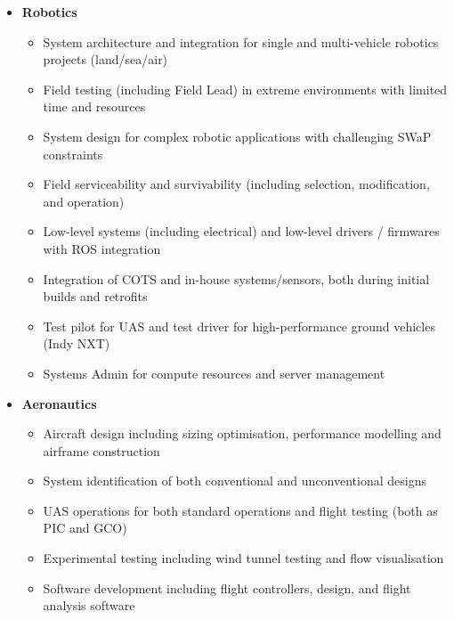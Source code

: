 \documentclass[12pt,letter,sans]{moderncv}
\begin{document}
\begin{itemize}
\item
{
    \textbf{Robotics}
        \vspace{3pt} 
        \begin{itemize}
			\item System architecture and integration for single and multi-vehicle robotics projects (land/sea/air)
            \item Field testing (including Field Lead) in extreme environments with limited time and resources
            \item System design for complex robotic applications with challenging SWaP constraints%
            \item Field serviceability and survivability (including selection, modification, and operation)
            \item Low-level systems (including electrical) and low-level drivers / firmwares with ROS integration
            \item Integration of COTS and in-house systems/sensors, both during initial builds and retrofits %
            \item Test pilot for UAS and test driver for high-performance ground vehicles (Indy NXT)
            \item Systems Admin for compute resources and server management
        \end{itemize}
}

\vspace{4pt}

\item
{
    \textbf{Aeronautics}
        \vspace{3pt} 
        \begin{itemize} 
            \item Aircraft design including sizing optimisation, performance modelling and airframe construction
            \item System identification of both conventional and unconventional designs
            \item UAS operations for both standard operations and flight testing (both as PIC and GCO)
            \item Experimental testing including wind tunnel testing and flow visualisation
            \item Software development including flight controllers, design, and flight analysis software
        \end{itemize}
}


\end{itemize}
\end{document}
